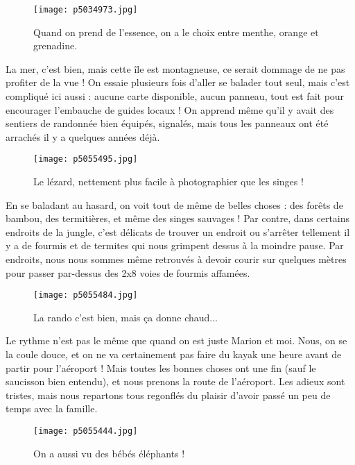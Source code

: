 \documentclass{book}
\begin{document}
\begin{figure}[h]
\centering
\texttt{[image: p5034973.jpg]}
\caption*{Quand on prend de l'essence, on a le choix entre menthe, orange et grenadine.}
\end{figure}

La mer, c'est bien, mais cette île est montagneuse, ce serait dommage de ne pas profiter de la vue ! On essaie plusieurs fois d'aller se balader tout seul, mais c'est compliqué ici aussi : aucune carte disponible, aucun panneau, tout est fait pour encourager l'embauche de guides locaux ! On apprend même qu'il y avait des sentiers de randonnée bien équipés, signalés, mais tous les panneaux ont été arrachés il y a quelques années déjà.


\begin{figure}[h]
\centering
\texttt{[image: p5055495.jpg]}
\caption*{Le lézard, nettement plus facile à photographier que les singes !}
\end{figure}

En se baladant au hasard, on voit tout de même de belles choses : des forêts de bambou, des termitières, et même des singes sauvages ! Par contre, dans certains endroits de la jungle, c'est délicats de trouver un endroit ou s'arrêter tellement il y a de fourmis et de termites qui nous grimpent dessus à la moindre pause. Par endroits, nous nous sommes même retrouvés à devoir courir sur quelques mètres pour passer par-dessus des 2x8 voies de fourmis affamées.


\begin{figure}[h]
\centering
\texttt{[image: p5055484.jpg]}
\caption*{La rando c'est bien, mais ça donne chaud...}
\end{figure}

Le rythme n'est pas le même que quand on est juste Marion et moi. Nous, on se la coule douce, et on ne va certainement pas faire du kayak une heure avant de partir pour l'aéroport ! Mais toutes les bonnes choses ont une fin (sauf le saucisson bien entendu), et nous prenons la route de l'aéroport. Les adieux sont tristes, mais nous repartons tous regonflés du plaisir d'avoir passé un peu de temps avec la famille.


\begin{figure}[h]
\centering
\texttt{[image: p5055444.jpg]}
\caption*{On a aussi vu des bébés éléphants !}
\end{figure}
\end{document}
